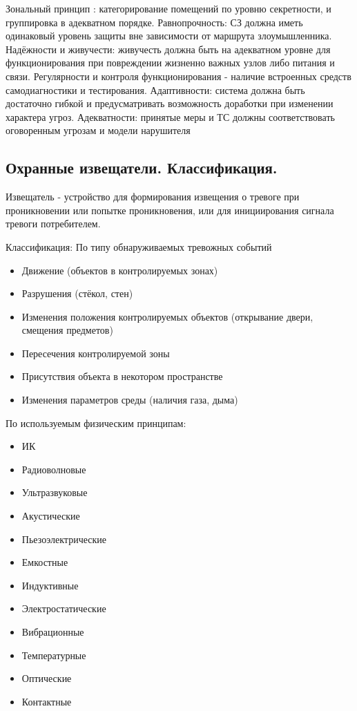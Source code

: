 \documentclass[a4paper,12pt]{report}
\begin{document}
	Зональный принцип : категорирование помещений по уровню секретности, и группировка в адекватном порядке.
	Равнопрочность: СЗ должна иметь одинаковый уровень защиты вне зависимости от маршрута злоумышленника.
	Надёжности и живучести: живучесть должна быть на адекватном уровне для функционирования при повреждении жизненно важных узлов либо питания и связи.
	Регулярности и контроля функционирования - наличие встроенных средств самодиагностики и тестирования.
	Адаптивности: система должна быть достаточно гибкой и предусматривать возможность доработки при изменении характера угроз.
	Адекватности: принятые меры и ТС должны соответствовать оговоренным угрозам и модели нарушителя


	\subsection{Охранные извещатели. Классификация.}

	Извещатель - устройство для формирования извещения о тревоге при проникновении или попытке проникновения, или для инициирования сигнала тревоги потребителем.

	Классификация:
	По типу обнаруживаемых тревожных событий
	\begin{itemize}
	\item	Движение (объектов в контролируемых зонах)
	\item	Разрушения (стёкол, стен)
	\item	Изменения положения контролируемых объектов (открывание двери, смещения предметов)
	\item	Пересечения контролируемой зоны
	\item	Присутствия объекта в некотором пространстве
	\item	Изменения параметров среды (наличия газа, дыма)
	\end{itemize}

	По используемым физическим принципам:
	\begin{itemize}
	\item	ИК
	\item	Радиоволновые
	\item	Ультразвуковые
	\item	Акустические
	\item	Пьезоэлектрические
	\item	Емкостные
	\item	Индуктивные
	\item	Электростатические
	\item	Вибрационные
	\item	Температурные
	\item	Оптические
	\item	Контактные
	\end{itemize}
\end{document}
